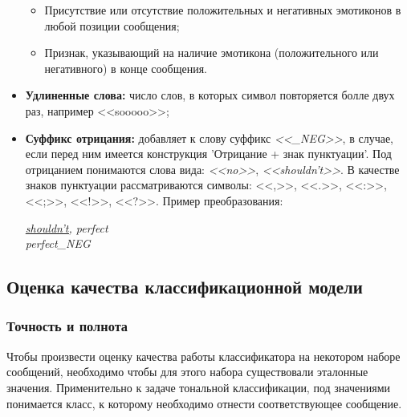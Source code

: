 \begin{itemize}
                \begin{itemize}
                    \item Присутствие или отсутствие положительных и негативных
                        эмотиконов в любой позиции сообщения;
                    \item Признак, указывающий на наличие эмотикона (положительного
                        или негативного) в конце сообщения.
                \end{itemize}
            \item {\bf Удлиненные слова:} число слов, в которых символ повторяется болле
                двух раз, например <<sooooo>>;
            \item {\bf Суффикс отрицания:} добавляет к слову суффикс {\it <<\_NEG>>},
                в случае, если перед ним имеется конструкция 'Отрицание +
                знак пунктуации'.
                Под отрицанием понимаются слова вида: {\it<<no>>}, {\it <<shouldn't>>}.
                В качестве знаков пунктуации рассматриваются символы:
                <<,>>, <<.>>, <<:>>, <<;>>, <<!>>, <<?>>.
                Пример преобразования:
                \begin{center}
                    \it
                    \underline{shouldn't,} perfect \\
                    perfect\_NEG
                \end{center}
        \end{itemize}








    \subsection{Оценка качества классификационной модели}

        \subsubsection{Точность и полнота}
    Чтобы произвести оценку качества работы классификатора на некотором наборе
    сообщений, необходимо чтобы для этого набора существовали эталонные
    значения. Применительно к задаче тональной классификации, под значениями
    понимается класс, к которому необходимо отнести соответствующее сообщение.

